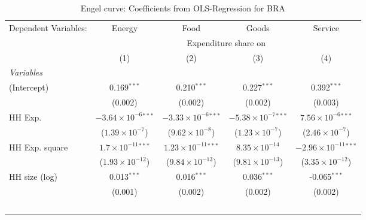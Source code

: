 
\begin{table}[htbp!]
   \centering
   \small
   \begin{adjustbox}{width = 1\textwidth, max height = 0.95\textheight, center}
      \begin{threeparttable}[b]
         \caption{\label{tab:Engel_parametric_BRA} Engel curve: Coefficients from OLS-Regression for BRA}
         \begin{tabular}{lcccc}
            \tabularnewline \midrule \midrule
            Dependent Variables: & Energy                         & Food                           & Goods                          & Service\\  
             & \multicolumn{4}{c}{Expenditure share on} \\ 
                                 & (1)                            & (2)                            & (3)                            & (4)\\  
            \midrule
            \emph{Variables}\\
            (Intercept)          & 0.169$^{***}$                  & 0.210$^{***}$                  & 0.227$^{***}$                  & 0.392$^{***}$\\   
                                 & (0.002)                        & (0.002)                        & (0.002)                        & (0.003)\\   
            HH Exp.              & $-3.64\times 10^{-6}$$^{***}$  & $-3.33\times 10^{-6}$$^{***}$  & $-5.38\times 10^{-7}$$^{***}$  & $7.56\times 10^{-6}$$^{***}$\\    
                                 & ($1.39\times 10^{-7}$)         & ($9.62\times 10^{-8}$)         & ($1.23\times 10^{-7}$)         & ($2.46\times 10^{-7}$)\\    
            HH Exp. square       & $1.7\times 10^{-11}$$^{***}$   & $1.23\times 10^{-11}$$^{***}$  & $8.35\times 10^{-14}$          & $-2.96\times 10^{-11}$$^{***}$\\    
                                 & ($1.93\times 10^{-12}$)        & ($9.84\times 10^{-13}$)        & ($9.81\times 10^{-13}$)        & ($3.35\times 10^{-12}$)\\    
            HH size (log)        & 0.013$^{***}$                  & 0.016$^{***}$                  & 0.036$^{***}$                  & -0.065$^{***}$\\   
                                 & (0.001)                        & (0.002)                        & (0.002)                        & (0.002)\\   
$$
\end{tabular}
\end{threeparttable}
\end{adjustbox}
\end{table}
